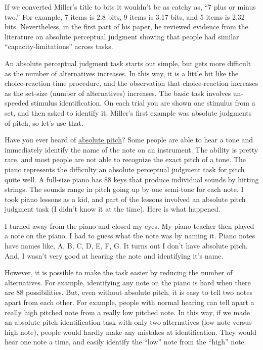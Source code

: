\documentclass[
  oneside,
  12pt]{crumpbook}
\begin{document}
If we converted Miller's title to bits it wouldn't be as catchy as, ``7 plus or minus two.'' For example, 7 items is 2.8 bits, 9 items is 3.17 bits, and 5 items is 2.32 bits. Nevertheless, in the first part of his paper, he reviewed evidence from the literature on absolute perceptual judgment showing that people had similar ``capacity-limitations'' across tasks.

An absolute perceptual judgment task starts out simple, but gets more difficult as the number of alternatives increases. In this way, it is a little bit like the choice-reaction time procedure, and the observation that choice-reaction increases as the set-size (number of alternatives) increases. The basic task involves un-speeded stimulus identification. On each trial you are shown one stimulus from a set, and then asked to identify it. Miller's first example was absolute judgments of pitch, so let's use that.

Have you ever heard of \href{https://en.wikipedia.org/wiki/Absolute_pitch}{absolute pitch}? Some people are able to hear a tone and immediately identify the name of the note on an instrument. The ability is pretty rare, and most people are not able to recognize the exact pitch of a tone. The piano represents the difficulty an absolute perceptual judgment task for pitch quite well. A full-size piano has 88 keys that produce individual sounds by hitting strings. The sounds range in pitch going up by one semi-tone for each note. I took piano lessons as a kid, and part of the lessons involved an absolute pitch judgment task (I didn't know it at the time). Here is what happened.

I turned away from the piano and closed my eyes. My piano teacher then played a note on the piano. I had to guess what the note was by naming it. Piano notes have names like, A, B, C, D, E, F, G. It turns out I don't have absolute pitch. And, I wasn't very good at hearing the note and identifying it's name.

However, it is possible to make the task easier by reducing the number of alternatives. For example, identifying any note on the piano is hard when there are 88 possibilities. But, even without absolute pitch, it is easy to tell two notes apart from each other. For example, people with normal hearing can tell apart a really high pitched note from a really low pitched note. In this way, if we made an absolute pitch identification task with only two alternatives (low note versus high note), people would hardly make any mistakes at identification. They would hear one note a time, and easily identify the ``low'' note from the ``high'' note.
\end{document}
